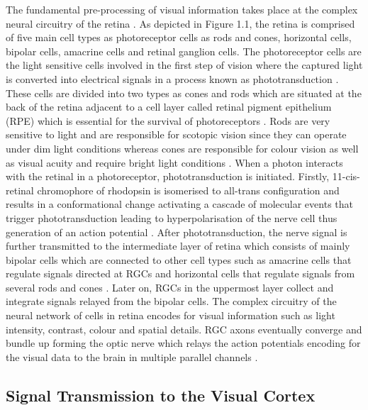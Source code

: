 The fundamental pre-processing of visual information takes place at the complex neural circuitry of the retina \cite{schwartz_2012}. As depicted in Figure 1.1, the retina is comprised of five main cell types as photoreceptor cells as rods and cones, horizontal cells, bipolar cells, amacrine cells and retinal ganglion cells. The photoreceptor cells are the light sensitive cells involved in the first step of vision where the captured light is converted into electrical signals in a process known as phototransduction \cite{molday2015photoreceptors}. These cells are divided into two types as cones and rods which are situated at the back of the retina adjacent to a cell layer called retinal pigment epithelium (RPE) which is essential for the survival of photoreceptors \cite{molday2015photoreceptors}. Rods are very sensitive to light and are responsible for scotopic vision since they can operate under dim light conditions whereas cones are responsible for colour vision as well as visual acuity and require bright light conditions \cite{molday2015photoreceptors}. When a photon interacts with the retinal in a photoreceptor, phototransduction is initiated. Firstly, 11-cis-retinal chromophore of rhodopsin is isomerised to all-trans configuration and results in a conformational change activating a cascade of molecular events that trigger phototransduction leading to hyperpolarisation of the nerve cell thus generation of an action potential \cite{palczewski2014chemistry}. After phototransduction,  the nerve signal is further transmitted to the intermediate layer of retina which consists of mainly bipolar cells which are connected to other cell types such as amacrine cells that regulate signals directed at RGCs and horizontal cells that regulate signals from several rods and cones \cite{holmes2018reconstructing}. Later on, RGCs in the uppermost layer collect and integrate signals relayed from the bipolar cells. The complex circuitry of the neural network of cells in retina encodes for visual information such as light intensity, contrast, colour and spatial details. RGC axons eventually converge and bundle up forming the optic nerve which relays the action potentials encoding for the visual data to the brain in multiple parallel channels \cite{schwartz_2012}.

\subsection{Signal Transmission to the Visual Cortex}

